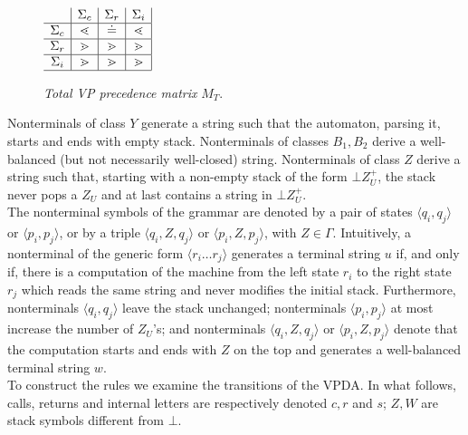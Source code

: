 \documentclass[3p,11pt]{elsarticle}
\begin{document}
\begin{figure}[h]
\begin{center}
$
\begin{array}{c|c|c|c|}
    & \Sigma_c & \Sigma_r& \Sigma_i  \\\hline
 \Sigma_c  & \lessdot  & \doteq &  \lessdot \\\hline
 \Sigma_r  & \gtrdot  & \gtrdot  & \gtrdot  \\\hline
  \Sigma_i   & \gtrdot  & \gtrdot  & \gtrdot  \\
  \hline
\end{array}
$
\end{center}
\caption{\label{figureTotalVPmatr}\emph{Total VP precedence matrix} $M_T$. }
\end{figure}
Nonterminals of class $Y$ generate a string such that the automaton, parsing it, starts and ends with empty stack. Nonterminals of classes $B_1,B_2$ derive a well-balanced (but not necessarily well-closed) string. Nonterminals of class $Z$ derive a string such that, starting with a non-empty stack of the form $\bot Z_U^+$, the stack never pops a $Z_U$ and at last contains a string in $\bot Z_U^+$.
\\
The nonterminal symbols of the grammar are denoted  by a pair of states $\langle q_i, q_j\rangle$ or $\langle p_i, p_j\rangle$, or by a triple $\langle q_i,Z,q_j\rangle$ or $\langle p_i,Z,p_j\rangle$, with $Z \in \Gamma$. Intuitively, a nonterminal of the generic form $\langle r_i\ldots r_j\rangle$ generates a terminal string $u$ if, and only if, there is a computation of the machine from the left state $r_i$ to the right state  $r_j$ which reads the same string and never modifies the initial stack. Furthermore, nonterminals $\langle q_i, q_j\rangle$ leave the stack unchanged; nonterminals $\langle p_i, p_j\rangle$ at most increase the number of $Z_U$'s; and nonterminals $\langle q_i,Z,q_j\rangle$ or $\langle p_i,Z,p_j\rangle$ denote that the computation starts and ends with $Z$ on the top and generates a well-balanced terminal string $w$.
\\
To construct the rules we examine the transitions of the  VPDA. In what follows, calls, returns and internal letters are respectively denoted $c, r$ and $s$; $Z,W$ are stack symbols different from $\bot$.
\end{document}
